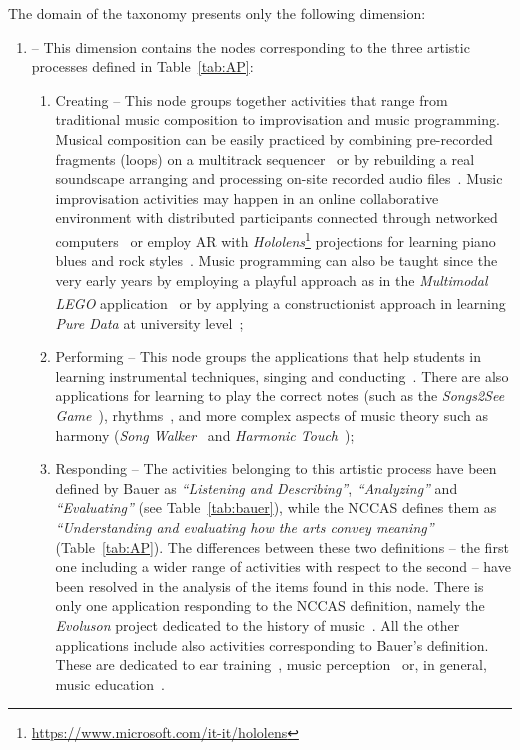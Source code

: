 \documentclass[10pt,journal,compsoc]{IEEEtran}
\newcommand{\domain}[1]{{\fontfamily{cmss}\selectfont {\textsc{#1}}}}
\newcommand{\dimension}[1]{{\fontfamily{cmss}\selectfont {\textit{#1}}}}
\newcommand{\node}[1]{{\fontfamily{cmss}\selectfont #1}}
\begin{document}
The \domain{Musical} domain of the taxonomy presents only the following dimension:
\begin{enumerate}[label=2.\arabic*.,leftmargin=0.7cm,listparindent=-\leftmargin, start=0]
\item \dimension{Activity} -- This dimension contains the nodes corresponding to the three artistic processes defined in Table~\ref{tab:AP}:

\begin{enumerate}[label=2.0.\arabic*.,leftmargin=0.9cm,listparindent=-\leftmargin, start=0]

\item \node{Creating} -- This node groups together activities that range from traditional music composition to improvisation and music programming. Musical composition can be easily practiced by combining pre-recorded fragments (loops) on a multitrack sequencer~\cite{gall2005music} or by rebuilding a real soundscape arranging and processing on-site recorded audio files~\cite{savage2001dunwich}. Music improvisation activities may happen in an online collaborative environment with distributed participants connected through networked computers~\cite{brown2007networked} or employ AR with \textit{Hololens}\footnote{\url{https://www.microsoft.com/it-it/hololens}} projections for learning piano blues and rock styles~\cite{das2017music}. Music programming can also be taught since the very early years by employing a playful approach as in the \textit{Multimodal LEGO\textsuperscript{\textregistered}} application~\cite{blm2017fosteringcomputational, ludovico2017multimodal} or by applying a constructionist approach in learning \textit{Pure Data} at university level~\cite{hancock2014play};
\item \node{Performing} -- This node groups the applications that help students in learning instrumental techniques, singing and conducting~\cite{hollinger2005effects,lee2004you}. There are also applications for learning to play the correct notes (such as the \textit{Songs2See Game}~\cite{dittmar2012music}), rhythms~\cite{chou}, and more complex aspects of music theory such as harmony (\textit{Song Walker}~\cite{bouwer} and \textit{Harmonic Touch}~\cite{mandanici});
\item \node{Responding} -- The activities belonging to this artistic process have been defined by Bauer as \textit{``Listening and Describing''}, \textit{``Analyzing''} and \textit{``Evaluating''} (see Table~\ref{tab:bauer}), while the NCCAS defines them as \textit{``Understanding and evaluating how the arts convey meaning''} (Table~\ref{tab:AP}). The differences between these two definitions -- the first one including a wider range of activities with respect to the second -- have been resolved in the analysis of the items found in this node. There is only one application responding to the NCCAS definition, namely the \textit{Evoluson} project dedicated to the history of music~\cite{gaugne2018evoluson}. All the other applications include also activities corresponding to Bauer's definition. These are dedicated to ear training~\cite{portowitz2014harmony}, music perception~\cite{farinazzo} or, in general, music education~\cite{frosini}.
\end{enumerate}
\end{enumerate}
\end{document}
